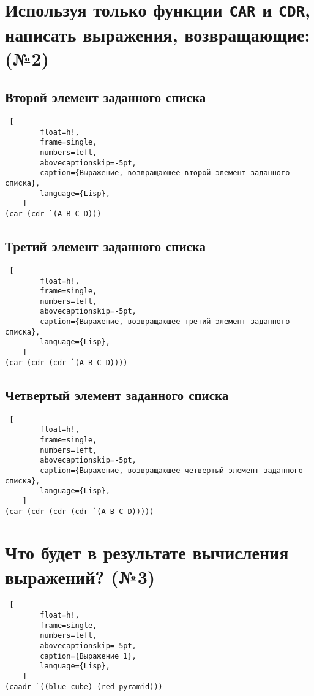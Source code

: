 \clearpage

\section{Используя только функции \texttt{CAR} и \texttt{CDR}, написать выражения, возвращающие: (№2)}

\subsection{Второй элемент заданного списка}

\begin{lstlisting} [
		float=h!,
		frame=single,
		numbers=left,
		abovecaptionskip=-5pt,
		caption={Выражение, возвращающее второй элемент заданного списка},
		language={Lisp},
	]
(car (cdr `(A B C D)))
\end{lstlisting}

\subsection{Третий элемент заданного списка}

\begin{lstlisting} [
		float=h!,
		frame=single,
		numbers=left,
		abovecaptionskip=-5pt,
		caption={Выражение, возвращающее третий элемент заданного списка},
		language={Lisp},
	]
(car (cdr (cdr `(A B C D))))
\end{lstlisting}

\subsection{Четвертый элемент заданного списка}

\begin{lstlisting} [
		float=h!,
		frame=single,
		numbers=left,
		abovecaptionskip=-5pt,
		caption={Выражение, возвращающее четвертый элемент заданного списка},
		language={Lisp},
	]
(car (cdr (cdr (cdr `(A B C D)))))
\end{lstlisting}

\section{Что будет в результате вычисления выражений? (№3)}


\begin{lstlisting} [
		float=h!,
		frame=single,
		numbers=left,
		abovecaptionskip=-5pt,
		caption={Выражение 1},
		language={Lisp},
	]
(caadr `((blue cube) (red pyramid)))
\end{lstlisting}

